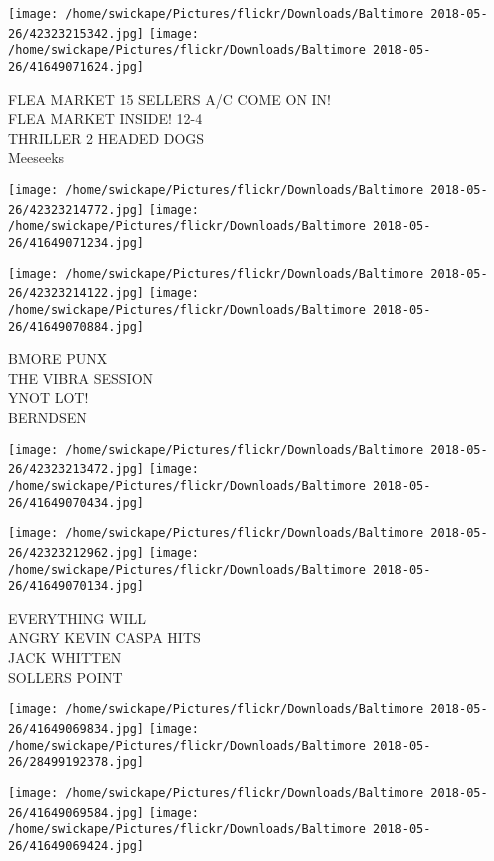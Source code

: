 \documentclass[10pt,letterpaper]{article}
\begin{document}
\texttt{[image: /home/swickape/Pictures/flickr/Downloads/Baltimore 2018-05-26/42323215342.jpg]}
\texttt{[image: /home/swickape/Pictures/flickr/Downloads/Baltimore 2018-05-26/41649071624.jpg]}

FLEA MARKET 15 SELLERS A/C COME ON IN!\\
FLEA MARKET INSIDE! 12{-}4\\
THRILLER 2 HEADED DOGS\\
Meeseeks\\
\pagebreak

\texttt{[image: /home/swickape/Pictures/flickr/Downloads/Baltimore 2018-05-26/42323214772.jpg]}
\texttt{[image: /home/swickape/Pictures/flickr/Downloads/Baltimore 2018-05-26/41649071234.jpg]}

\texttt{[image: /home/swickape/Pictures/flickr/Downloads/Baltimore 2018-05-26/42323214122.jpg]}
\texttt{[image: /home/swickape/Pictures/flickr/Downloads/Baltimore 2018-05-26/41649070884.jpg]}

BMORE PUNX\\
THE VIBRA SESSION\\
YNOT LOT!\\
BERNDSEN\\
\pagebreak

\texttt{[image: /home/swickape/Pictures/flickr/Downloads/Baltimore 2018-05-26/42323213472.jpg]}
\texttt{[image: /home/swickape/Pictures/flickr/Downloads/Baltimore 2018-05-26/41649070434.jpg]}

\texttt{[image: /home/swickape/Pictures/flickr/Downloads/Baltimore 2018-05-26/42323212962.jpg]}
\texttt{[image: /home/swickape/Pictures/flickr/Downloads/Baltimore 2018-05-26/41649070134.jpg]}

EVERYTHING WILL\\
ANGRY KEVIN CASPA HITS\\
JACK WHITTEN\\
SOLLERS POINT\\
\pagebreak

\texttt{[image: /home/swickape/Pictures/flickr/Downloads/Baltimore 2018-05-26/41649069834.jpg]}
\texttt{[image: /home/swickape/Pictures/flickr/Downloads/Baltimore 2018-05-26/28499192378.jpg]}

\texttt{[image: /home/swickape/Pictures/flickr/Downloads/Baltimore 2018-05-26/41649069584.jpg]}
\texttt{[image: /home/swickape/Pictures/flickr/Downloads/Baltimore 2018-05-26/41649069424.jpg]}
\end{document}
